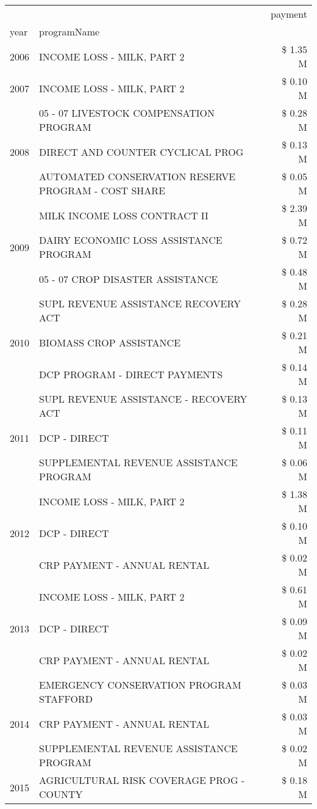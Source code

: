 \begin{tabular}{llr}
\toprule
 &  & payment \\
year & programName &  \\
\midrule
2006 & INCOME LOSS - MILK, PART 2 & \$ 1.35 M \\
\cline{1-3}
2007 & INCOME LOSS - MILK, PART 2 & \$ 0.10 M \\
\cline{1-3}
\multirow[t]{3}{*}{2008} & 05 - 07 LIVESTOCK COMPENSATION PROGRAM & \$ 0.28 M \\
 & DIRECT AND COUNTER CYCLICAL PROG & \$ 0.13 M \\
 & AUTOMATED CONSERVATION RESERVE PROGRAM - COST SHARE & \$ 0.05 M \\
\cline{1-3}
\multirow[t]{3}{*}{2009} & MILK INCOME LOSS CONTRACT II & \$ 2.39 M \\
 & DAIRY ECONOMIC LOSS ASSISTANCE PROGRAM & \$ 0.72 M \\
 & 05 - 07 CROP DISASTER ASSISTANCE & \$ 0.48 M \\
\cline{1-3}
\multirow[t]{3}{*}{2010} & SUPL REVENUE ASSISTANCE RECOVERY ACT & \$ 0.28 M \\
 & BIOMASS CROP ASSISTANCE & \$ 0.21 M \\
 & DCP PROGRAM - DIRECT PAYMENTS & \$ 0.14 M \\
\cline{1-3}
\multirow[t]{3}{*}{2011} & SUPL REVENUE ASSISTANCE - RECOVERY ACT & \$ 0.13 M \\
 & DCP - DIRECT & \$ 0.11 M \\
 & SUPPLEMENTAL REVENUE ASSISTANCE PROGRAM & \$ 0.06 M \\
\cline{1-3}
\multirow[t]{3}{*}{2012} & INCOME LOSS - MILK, PART 2 & \$ 1.38 M \\
 & DCP - DIRECT & \$ 0.10 M \\
 & CRP PAYMENT - ANNUAL RENTAL & \$ 0.02 M \\
\cline{1-3}
\multirow[t]{3}{*}{2013} & INCOME LOSS - MILK, PART 2 & \$ 0.61 M \\
 & DCP - DIRECT & \$ 0.09 M \\
 & CRP PAYMENT - ANNUAL RENTAL & \$ 0.02 M \\
\cline{1-3}
\multirow[t]{3}{*}{2014} & EMERGENCY CONSERVATION PROGRAM STAFFORD & \$ 0.03 M \\
 & CRP PAYMENT - ANNUAL RENTAL & \$ 0.03 M \\
 & SUPPLEMENTAL REVENUE ASSISTANCE PROGRAM & \$ 0.02 M \\
\cline{1-3}
\multirow[t]{3}{*}{2015} & AGRICULTURAL RISK COVERAGE PROG - COUNTY & \$ 0.18 M \\

\end{tabular}
